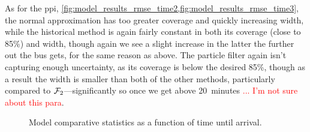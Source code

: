 As for the \gls{ppi}, \cref{fig:model_results_rmse_time2,fig:model_results_rmse_time3}, the normal approximation has too greater coverage and quickly increasing width, while the historical method is again fairly constant in both its coverage (close to 85\%) and width, though again we see a slight increase in the latter the further out the bus gets, for the same reason as above. The particle filter again isn't capturing enough uncertainty, as its coverage is below the desired 85\%, though as a result the width is smaller than both of the other methods, particularly compared to $\mathcal{F}_2$---significantly so once we get above 20~minutes  \textcolor{red}{... I'm not sure about this para}.


\begin{knitrout}
\color{fgcolor}\begin{figure}[!t]
\newline
{}\newline
{}\caption[Model comparative statistics as a function of time until arrival]{Model comparative statistics as a function of time until arrival.}\label{fig:model_results_rmse_time}
\end{figure}


\end{knitrout}



